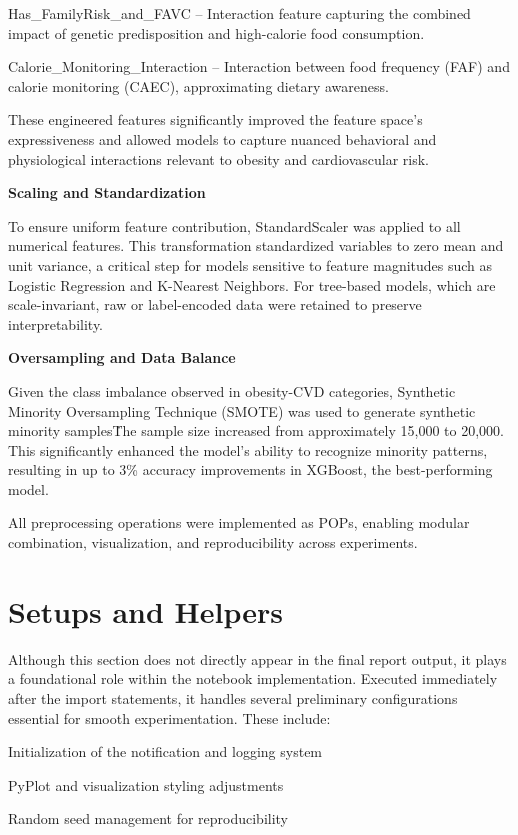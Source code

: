Has\_FamilyRisk\_and\_FAVC -- Interaction feature capturing the combined impact of genetic predisposition and high-calorie food consumption.

Calorie\_Monitoring\_Interaction -- Interaction between food frequency (FAF) and calorie monitoring (CAEC), approximating dietary awareness.

These engineered features significantly improved the feature space's expressiveness and allowed models to capture nuanced behavioral and physiological interactions relevant to obesity and cardiovascular risk.

\textbf{Scaling and Standardization}

To ensure uniform feature contribution, StandardScaler was applied to all numerical features.
This transformation standardized variables to zero mean and unit variance, a critical step for models sensitive to feature magnitudes such as Logistic Regression and K-Nearest Neighbors.
For tree-based models, which are scale-invariant, raw or label-encoded data were retained to preserve interpretability.

\textbf{Oversampling and Data Balance}

Given the class imbalance observed in obesity-CVD categories, Synthetic Minority Oversampling Technique (SMOTE) was used to generate synthetic minority samples\. The sample size increased from approximately 15,000 to 20,000.
This significantly enhanced the model's ability to recognize minority patterns, resulting in up to 3\% accuracy improvements in XGBoost, the best-performing model.

All preprocessing operations were implemented as POPs, enabling modular combination, visualization, and reproducibility across experiments.


\section{Setups and Helpers}\label{sec:setups-and-helpers}
Although this section does not directly appear in the final report output, it plays a foundational role within the notebook implementation.
Executed immediately after the import statements, it handles several preliminary configurations essential for smooth experimentation.
These include:

Initialization of the notification and logging system

PyPlot and visualization styling adjustments

Random seed management for reproducibility

